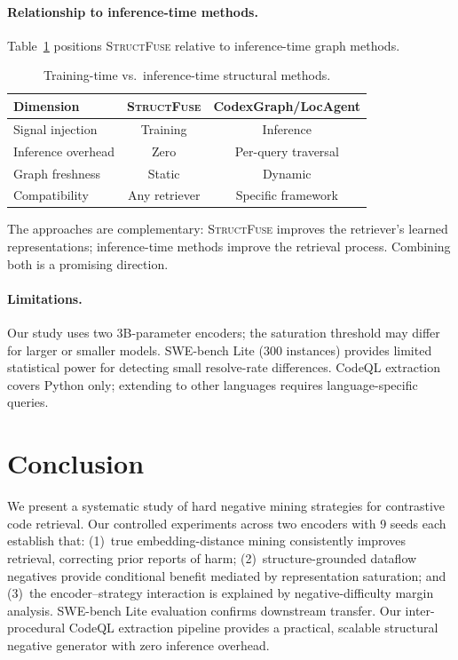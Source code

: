 \documentclass[11pt,a4paper]{article}
\newcommand{\ours}{\textsc{StructFuse}}
\begin{document}
\paragraph{Relationship to inference-time methods.}
Table~\ref{tab:paradigm} positions \ours{} relative to inference-time graph methods.

\begin{table}[t]
\centering
\small
\caption{Training-time vs.\ inference-time structural methods.}
\label{tab:paradigm}
\begin{tabular}{lcc}
\toprule
\textbf{Dimension} & \textbf{\ours{}} & \textbf{CodexGraph/LocAgent} \\
\midrule
Signal injection & Training & Inference \\
Inference overhead & Zero & Per-query traversal \\
Graph freshness & Static & Dynamic \\
Compatibility & Any retriever & Specific framework \\
\bottomrule
\end{tabular}
\end{table}

The approaches are complementary: \ours{} improves the retriever's learned representations; inference-time methods improve the retrieval process. Combining both is a promising direction.

\paragraph{Limitations.} Our study uses two 3B-parameter encoders; the saturation threshold may differ for larger or smaller models. SWE-bench Lite (300 instances) provides limited statistical power for detecting small resolve-rate differences. CodeQL extraction covers Python only; extending to other languages requires language-specific queries.

\section{Conclusion}

We present a systematic study of hard negative mining strategies for contrastive code retrieval. Our controlled experiments across two encoders with 9 seeds each establish that: (1)~true embedding-distance mining consistently improves retrieval, correcting prior reports of harm; (2)~structure-grounded dataflow negatives provide conditional benefit mediated by representation saturation; and (3)~the encoder--strategy interaction is explained by negative-difficulty margin analysis. SWE-bench Lite evaluation confirms downstream transfer. Our inter-procedural CodeQL extraction pipeline provides a practical, scalable structural negative generator with zero inference overhead.


\end{document}
